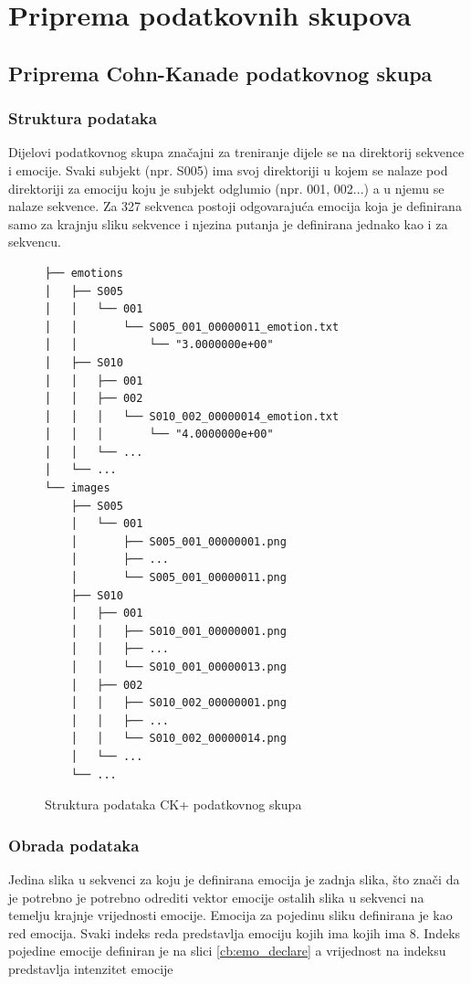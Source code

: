 \documentclass[times, utf8, zavrsni,numeric,pstricks]{fer}
\begin{document}
\section{Priprema podatkovnih skupova}\label{priprema_ck}
\subsection{Priprema Cohn-Kanade podatkovnog skupa}
\subsubsection{Struktura podataka}

Dijelovi podatkovnog skupa značajni za treniranje dijele se na direktorij sekvence i emocije. Svaki subjekt (npr. S005) ima svoj direktoriji u kojem se nalaze pod direktoriji za emociju koju je subjekt odglumio (npr. 001, 002...) a u njemu se nalaze sekvence. Za 327 sekvenca postoji odgovarajuća emocija koja je definirana samo za krajnju sliku sekvence i njezina putanja je definirana jednako kao i za sekvencu.

\pagebreak

\begin{figure}[H]
\centering
\begin{Verbatim}[fontsize=\small]
├── emotions
│   ├── S005
│   │   └── 001
│   │       └── S005_001_00000011_emotion.txt
│   │       	└── "3.0000000e+00"
│   ├── S010
│   │   ├── 001
│   │   ├── 002
│   │   │   └── S010_002_00000014_emotion.txt
│   │   │   	└── "4.0000000e+00"
│   │   └── ...
│   └── ...
└── images
    ├── S005
    │   └── 001
    │       ├── S005_001_00000001.png
    │       ├── ...
    │       └── S005_001_00000011.png
    ├── S010
    │   ├── 001
    │   │   ├── S010_001_00000001.png
    │   │   ├── ...
    │   │   └── S010_001_00000013.png
    │   ├── 002
    │   │   ├── S010_002_00000001.png
    │   │   ├── ...
    │   │   └── S010_002_00000014.png
    │   └── ...
    └── ...

\end{Verbatim}
\caption{Struktura podataka CK+ podatkovnog skupa}
\label{cb:npy_tree}
\end{figure}

\subsubsection{Obrada podataka}
Jedina slika u sekvenci za koju je definirana emocija je zadnja slika, što znači da je potrebno je potrebno odrediti vektor emocije ostalih slika u sekvenci na temelju krajnje vrijednosti emocije. Emocija za pojedinu sliku definirana je kao red emocija. Svaki indeks reda predstavlja emociju kojih ima kojih ima 8. Indeks pojedine emocije definiran je na slici \ref{cb:emo_declare} a vrijednost na indeksu predstavlja intenzitet emocije
\end{document}
